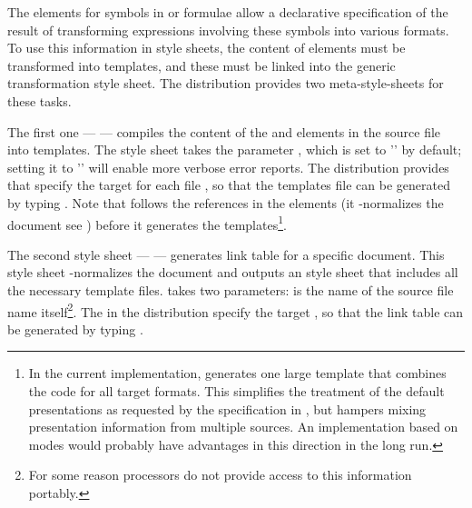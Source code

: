 \begin{omgroup}[id=transform-xsl,short=Transforming OMDoc]
The {} elements for symbols in {\openmath} or {\cmathml}
formulae allow a declarative specification of the result of transforming
expressions involving these symbols into various formats. To use this information
in {\xslt} style sheets, the content of {} elements must be
transformed into {\xslt} templates, and these must be linked into the generic
transformation style sheet. The {\omdoc} distribution provides two
meta-style-sheets for these tasks.

The first one --- {} --- compiles the content of the
{} and {} elements in the source file into {\xslt}
templates. The style sheet takes the parameter
{}, which is set to '{}' by default; setting it to
'{}' will enable more verbose error reports. The {\omdoc} distribution
provides {\unix} {} that specify the target
{} for each {\omdoc} file
{}, so that the templates file can be generated by typing
{}. Note that {} follows the
references in the {} elements (it {}-normalizes the document see
{}) before it generates the templates\footnote{In the current
  implementation, {} generates one large template that combines the
  {\xslt} code for all target formats. This simplifies the treatment of the default
  presentations as requested by the specification in {}, but
  hampers mixing presentation information from multiple sources. An implementation based
  on modes would probably have advantages in this direction in the long run.}.

The second style sheet --- {} --- generates link table for a
specific {\omdoc} document. This style sheet {}-normalizes the document and
outputs an {\xslt} style sheet that includes all the necessary template
files. {} takes two parameters: {} is the name of the
source file name itself\footnote{For some reason {\xslt} processors do not provide access
  to this information portably.}. The {} in the {\omdoc} distribution
specify the target {}, so that the link table can be
generated by typing {}.


\end{omgroup}
